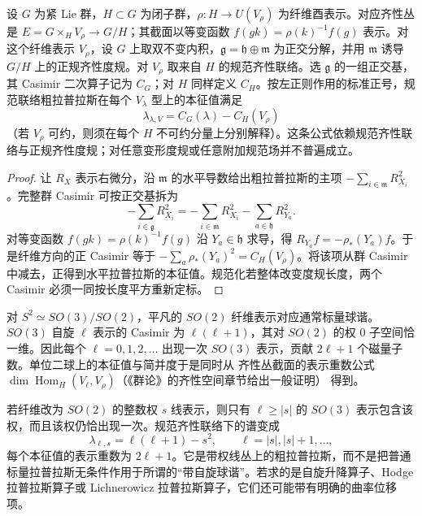 \begin{proposition}
设 $G$ 为紧 Lie 群，$H\subset G$ 为闭子群，$\rho:H\to U(V_\rho)$ 为纤维酉表示。对应齐性丛是 $E=G\times_HV_\rho\to G/H$；其截面以等变函数 $f(gk)=\rho(k)^{-1}f(g)$ 表示。对这个纤维表示 $V_\rho$，设 $G$ 上取双不变内积，$\mathfrak g=\mathfrak h\oplus\mathfrak m$ 为正交分解，并用 $\mathfrak m$ 诱导 $G/H$ 上的正规齐性度规。对 $V_\rho$ 取来自 $H$ 的规范齐性联络。选 $\mathfrak g$ 的一组正交基，其 Casimir 二次算子记为 $C_G$；对 $H$ 同样定义 $C_H$。按左正则作用的标准正号，规范联络粗拉普拉斯在每个 $V_\lambda$ 型上的本征值满足
\begin{equation}\label{eq:ghs-r6-casimir-bundle-laplacian}
\lambda_{\lambda,V}=C_G(\lambda)-C_H(V_\rho)
\end{equation}
（若 $V_\rho$ 可约，则须在每个 $H$ 不可约分量上分别解释）。这条公式依赖规范齐性联络与正规齐性度规；对任意变形度规或任意附加规范场并不普遍成立。

\end{proposition}
\begin{proof}
让 $R_X$ 表示右微分，沿 $\mathfrak m$ 的水平导数给出粗拉普拉斯的主项 $-\sum_{i\in\mathfrak m}R_{X_i}^2$。完整群 Casimir 可按正交基拆为
\[
-\sum_{i\in\mathfrak g}R_{X_i}^2
=-\sum_{i\in\mathfrak m}R_{X_i}^2-\sum_{a\in\mathfrak h}R_{Y_a}^2.
\]
对等变函数 $f(gk)=\rho(k)^{-1}f(g)$ 沿 $Y_a\in\mathfrak h$ 求导，得 $R_{Y_a}f=-\rho_*(Y_a)f$。于是纤维方向的正 Casimir 等于 $-\sum_a\rho_*(Y_a)^2=C_H(V_\rho)$。将该项从群 Casimir 中减去，正得到水平拉普拉斯的本征值。规范化若整体改变度规长度，两个 Casimir 必须一同按长度平方重新定标。
\end{proof}

对 $S^2\simeq SO(3)/SO(2)$，平凡的 $SO(2)$ 纤维表示对应通常标量球谐。$SO(3)$ 自旋 $\ell$ 表示的 Casimir 为 $\ell(\ell+1)$，其对 $SO(2)$ 的权 $0$ 子空间恰一维。因此每个 $\ell=0,1,2,\ldots$ 出现一次 $SO(3)$ 表示，贡献 $2\ell+1$ 个磁量子数。单位二球上的本征值与简并度于是同时从 齐性丛截面的表示重数公式 $\dim\operatorname{Hom}_H(V_\ell,V_\rho)$（《群论》的齐性空间章节给出一般证明） 得到。

若纤维改为 $SO(2)$ 的整数权 $s$ 线表示，则只有 $\ell\ge|s|$ 的 $SO(3)$ 表示包含该权，而且该权仍恰出现一次。规范齐性联络下的谱变成
\begin{equation}\label{eq:ghs-r6-spinweighted-laplacian}
\lambda_{\ell,s}=\ell(\ell+1)-s^2,
\qquad \ell=|s|,|s|+1,\ldots,
\end{equation}
每个本征值的表示重数为 $2\ell+1$。它是带权线丛上的粗拉普拉斯，而不是把普通标量拉普拉斯无条件作用于所谓的“带自旋球谐”。若求的是自旋升降算子、Hodge 拉普拉斯算子或 Lichnerowicz 拉普拉斯算子，它们还可能带有明确的曲率位移项。

